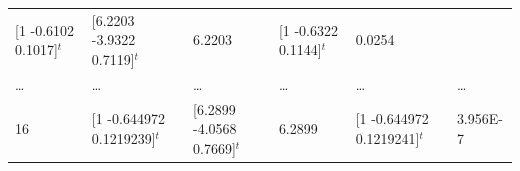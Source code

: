 \documentclass[openany]{book}
\begin{document}
\begin{longtable}[]{@{}llllll@{}}
\begin{minipage}[t]{0.20\columnwidth}
{[}1 -0.6102 0.1017{]}\(^t\)\strut
\end{minipage} & \begin{minipage}[t]{0.20\columnwidth}\raggedright
{[}6.2203 -3.9322 0.7119{]}\(^t\)\strut
\end{minipage} & \begin{minipage}[t]{0.05\columnwidth}\raggedright
6.2203\strut
\end{minipage} & \begin{minipage}[t]{0.27\columnwidth}\raggedright
{[}1 -0.6322 0.1144{]}\(^t\)\strut
\end{minipage} & \begin{minipage}[t]{0.09\columnwidth}\raggedright
0.0254\strut
\end{minipage}\tabularnewline
\begin{minipage}[t]{0.03\columnwidth}\raggedright
\ldots{}\strut
\end{minipage} & \begin{minipage}[t]{0.20\columnwidth}\raggedright
\ldots{}\strut
\end{minipage} & \begin{minipage}[t]{0.20\columnwidth}\raggedright
\ldots{}\strut
\end{minipage} & \begin{minipage}[t]{0.05\columnwidth}\raggedright
\ldots{}\strut
\end{minipage} & \begin{minipage}[t]{0.27\columnwidth}\raggedright
\ldots{}\strut
\end{minipage} & \begin{minipage}[t]{0.09\columnwidth}\raggedright
\ldots{}\strut
\end{minipage}\tabularnewline
\begin{minipage}[t]{0.03\columnwidth}\raggedright
16\strut
\end{minipage} & \begin{minipage}[t]{0.20\columnwidth}\raggedright
{[}1 -0.644972 0.1219239{]}\(^t\)\strut
\end{minipage} & \begin{minipage}[t]{0.20\columnwidth}\raggedright
{[}6.2899 -4.0568 0.7669{]}\(^t\)\strut
\end{minipage} & \begin{minipage}[t]{0.05\columnwidth}\raggedright
6.2899\strut
\end{minipage} & \begin{minipage}[t]{0.27\columnwidth}\raggedright
{[}1 -0.644972 0.1219241{]}\(^t\)\strut
\end{minipage} & \begin{minipage}[t]{0.09\columnwidth}\raggedright
3.956E-7\strut
\end{minipage}\tabularnewline
\bottomrule
\end{longtable}
\end{document}
